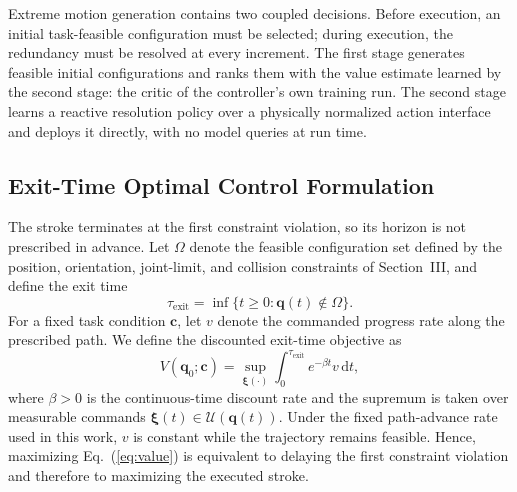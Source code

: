 \documentclass[journal, twoside]{IEEEtran}
\begin{document}
Extreme motion generation contains two coupled decisions. Before execution,
an initial task-feasible configuration must be selected; during execution,
the redundancy must be resolved at every increment. The first stage
generates feasible initial configurations and ranks them with the value
estimate learned by the second stage: the critic of the controller's
own training run. The second stage learns a reactive resolution policy
over a physically normalized action interface and deploys it directly,
with no model queries at run time.

\subsection{Exit-Time Optimal Control Formulation}
\label{sec:formulation}

The stroke terminates at the first constraint violation, so its horizon is
not prescribed in advance. Let $\Omega$ denote the feasible configuration
set defined by the position, orientation, joint-limit, and collision
constraints of Section~III, and define the exit time
\begin{equation}
\label{eq:exit-time}
\tau_{\mathrm{exit}}
=
\inf\{t\geq 0:\mathbf{q}(t)\notin\Omega\}.
\end{equation}
For a fixed task condition $\mathbf{c}$, let $v$ denote the commanded
progress rate along the prescribed path. We define the discounted
exit-time objective as
\begin{equation}
\label{eq:value}
V(\mathbf{q}_{0};\mathbf{c})
=
\sup_{\boldsymbol{\xi}(\cdot)}
\int_{0}^{\tau_{\mathrm{exit}}}
e^{-\beta t}
v\,\mathrm{d}t,
\end{equation}
where $\beta>0$ is the continuous-time discount rate and the supremum is
taken over measurable commands
$\boldsymbol{\xi}(t)\in\mathcal{U}(\mathbf{q}(t))$. Under the fixed
path-advance rate used in this work, $v$ is constant while the trajectory
remains feasible. Hence, maximizing Eq.~(\ref{eq:value}) is equivalent to
delaying the first constraint violation and therefore to maximizing the
executed stroke.
\end{document}
